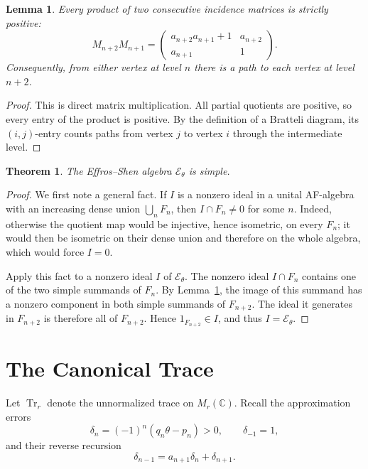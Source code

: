 \documentclass{book}
\newtheorem{lemma}[definition]{Lemma}
\newtheorem{theorem}[definition]{Theorem}
\begin{document}
\begin{lemma}\label{lemma:EffrosShenPositiveProducts}
  Every product of two consecutive incidence matrices is strictly positive:
  \[
    M_{n+2}M_{n+1}
      =
    \begin{pmatrix}
      a_{n+2}a_{n+1}+1&a_{n+2}\\
      a_{n+1}&1
    \end{pmatrix}.
  \]
  Consequently, from either vertex at level \(n\) there is a path to each
  vertex at level \(n+2\).
\end{lemma}

\begin{proof}
  This is direct matrix multiplication.  All partial quotients are positive,
  so every entry of the product is positive.  By the definition of a
  Bratteli diagram, its \((i,j)\)-entry counts paths from vertex \(j\) to
  vertex \(i\) through the intermediate level.
\end{proof}

\begin{theorem}\label{theorem:EffrosShenSimple}
  The Effros--Shen algebra \(\mathcal E_\theta\) is simple.
\end{theorem}

\begin{proof}
  We first note a general fact.  If \(I\) is a nonzero ideal in a unital
  AF-algebra with an increasing dense union \(\bigcup_nF_n\), then
  \(I\cap F_n\neq0\) for some \(n\).  Indeed, otherwise the quotient map
  would be injective, hence isometric, on every \(F_n\); it would then be
  isometric on their dense union and therefore on the whole algebra, which
  would force \(I=0\).

  Apply this fact to a nonzero ideal \(I\) of \(\mathcal E_\theta\).  The
  nonzero ideal \(I\cap F_n\) contains one of the two simple summands of
  \(F_n\).  By Lemma~\ref{lemma:EffrosShenPositiveProducts}, the image of
  this summand has a nonzero component in both simple summands of
  \(F_{n+2}\).  The ideal it generates in \(F_{n+2}\) is therefore all of
  \(F_{n+2}\).  Hence \(1_{F_{n+2}}\in I\), and thus
  \(I=\mathcal E_\theta\).
\end{proof}

\section{The Canonical Trace}

Let \(\operatorname{Tr}_r\) denote the unnormalized trace on
\(M_r(\mathbb C)\).  Recall the approximation errors
\[
  \delta_n=(-1)^n(q_n\theta-p_n)>0,
  \qquad \delta_{-1}=1,
\]
and their reverse recursion
\[
  \delta_{n-1}=a_{n+1}\delta_n+\delta_{n+1}.
\]
\end{document}
